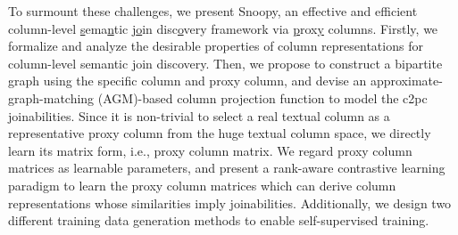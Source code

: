 


To surmount these challenges, we present \textsf{Snoopy}, an effective and efficient column-level \underline{s}ema\underline{n}tic  j\underline{o}in  disc\underline{o}very framework via \underline{p}rox\underline{y} columns. Firstly, we formalize and analyze the desirable properties of column representations for column-level semantic join discovery. Then, we propose to construct a bipartite graph using the specific column and proxy column, and devise an approximate-graph-matching (AGM)-based column projection function to model the c2pc joinabilities. Since it is non-trivial to select a real textual column as a representative proxy column from the huge textual column space, we directly learn its matrix form, i.e., proxy column matrix. 
We regard proxy column matrices as learnable parameters, and present a rank-aware contrastive learning paradigm to learn the proxy column matrices which can derive column representations whose similarities imply joinabilities.  Additionally, we design two different training data generation methods to enable self-supervised training.


